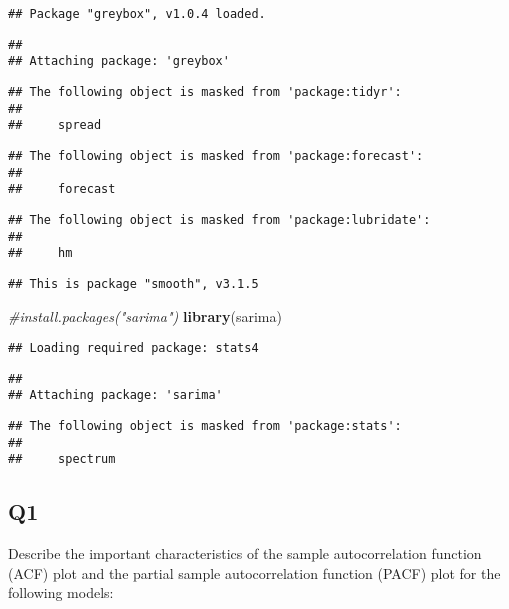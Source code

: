 \documentclass[
]{article}
\newenvironment{Shaded}{\begin{snugshade}}{\end{snugshade}}
\newcommand{\CommentTok}[1]{\textcolor[rgb]{0.56,0.35,0.01}{\textit{#1}}}
\newcommand{\KeywordTok}[1]{\textcolor[rgb]{0.13,0.29,0.53}{\textbf{#1}}}
\newcommand{\NormalTok}[1]{#1}
\begin{document}
\begin{verbatim}
## Package "greybox", v1.0.4 loaded.
\end{verbatim}

\begin{verbatim}
## 
## Attaching package: 'greybox'
\end{verbatim}

\begin{verbatim}
## The following object is masked from 'package:tidyr':
## 
##     spread
\end{verbatim}

\begin{verbatim}
## The following object is masked from 'package:forecast':
## 
##     forecast
\end{verbatim}

\begin{verbatim}
## The following object is masked from 'package:lubridate':
## 
##     hm
\end{verbatim}

\begin{verbatim}
## This is package "smooth", v3.1.5
\end{verbatim}

\begin{Shaded}
\begin{Highlighting}[]
\CommentTok{#install.packages("sarima")}
\KeywordTok{library}\NormalTok{(sarima)}
\end{Highlighting}
\end{Shaded}

\begin{verbatim}
## Loading required package: stats4
\end{verbatim}

\begin{verbatim}
## 
## Attaching package: 'sarima'
\end{verbatim}

\begin{verbatim}
## The following object is masked from 'package:stats':
## 
##     spectrum
\end{verbatim}

\hypertarget{q1}{%
\subsection{Q1}\label{q1}}

Describe the important characteristics of the sample autocorrelation
function (ACF) plot and the partial sample autocorrelation function
(PACF) plot for the following models:
\end{document}
